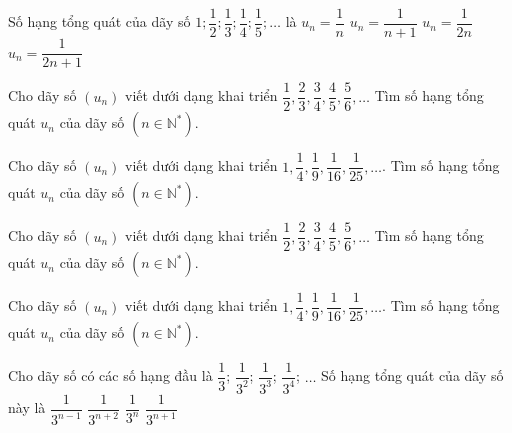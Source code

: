 \begin{ex}%
	Số hạng tổng quát của dãy số $1; \dfrac{1}{2}; \dfrac{1}{3}; \dfrac{1}{4}; \dfrac{1}{5};  \ldots$ là
	\choice 
		 {\True $u_n=\dfrac{1}{n}$}
		 {$u_n=\dfrac{1}{n+1}$}
		 {$u_n=\dfrac{1}{2n}$}
		 {$u_n=\dfrac{1}{2n+1}$}
\end{ex}

\begin{bt}%
	Cho dãy số $\left(u_n\right)$ viết dưới dạng khai triển $\dfrac{1}{2},\dfrac{2}{3},\dfrac{3}{4},\dfrac{4}{5},\dfrac{5}{6},\ldots$ Tìm  số hạng tổng quát $u_n$ của dãy số $\left(n\in \mathbb{N}^{\ast}\right)$.
\end{bt}

\begin{bt}%
	Cho dãy số $\left(u_n\right)$ viết dưới dạng khai triển $1,\dfrac{1}{4},\dfrac{1}{9},\dfrac{1}{16},\dfrac{1}{25},\ldots$. Tìm số hạng tổng  quát $u_n$ của dãy số $\left(n\in \mathbb{N}^{\ast}\right)$.
\end{bt}

\begin{ex}%
	Cho dãy số $\left(u_n\right)$ viết dưới dạng  khai triển $\dfrac{1}{2},\dfrac{2}{3},\dfrac{3}{4},\dfrac{4}{5},\dfrac{5}{6},\ldots$ Tìm số hạng tổng quát $u_n$ của dãy số $\left(n\in \mathbb{N}^{\ast}\right)$.
\end{ex}

\begin{ex}%
	 Cho dãy số $\left(u_n\right)$ viết dưới dạng khai triển $1,\dfrac{1}{4},\dfrac{1}{9},\dfrac{1}{16},\dfrac{1}{25},\ldots$. Tìm số hạng tổng quát $u_n$ của dãy số $\left(n\in \mathbb{N}^{\ast}\right)$.
\end{ex}

\begin{ex}%
	Cho dãy số có các số hạng đầu là $\dfrac{1}{3}$; $\dfrac{1}{3^2}$; $\dfrac{1}{3^3}$; $\dfrac{1}{3^4}$; $\ldots$ Số hạng tổng quát của dãy số  này là
	 \choice
		{$\dfrac{1}{3^{n-1}}$} 
		 {$\dfrac{1}{3^{n+2}}$}
		{\True  $\dfrac{1}{3^n}$}
		{$\dfrac{1}{3^{n+1}}$} 
\end{ex}

